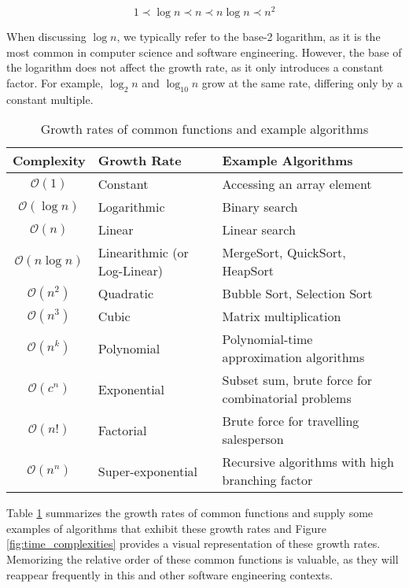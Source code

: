 \[
1 \prec \log n \prec n \prec n \log n \prec n^2
\]

\begin{remark}
    When discussing $\log n$, we typically refer to the base-2 logarithm, as it is the most common in computer science and software engineering. However, the base of the logarithm does not affect the growth rate, as it only introduces a constant factor. For example, $\log_2 n$ and $\log_{10} n$ grow at the same rate, differing only by a constant multiple.
\end{remark}

\begin{table}[h]
    \centering
    \renewcommand{\arraystretch}{1.4}
    \begin{tabular}{|c|l|l|}
        \hline
        \textbf{Complexity} & \textbf{Growth Rate} & \textbf{Example Algorithms} \\
        \hline
        \( \mathcal{O}(1) \) & Constant & Accessing an array element \\
        \hline
        \( \mathcal{O}(\log n) \) & Logarithmic & Binary search \\
        \hline
        \( \mathcal{O}(n) \) & Linear & Linear search \\
        \hline
        \( \mathcal{O}(n \log n) \) & Linearithmic (or Log-Linear) & MergeSort, QuickSort, HeapSort \\
        \hline
        \( \mathcal{O}(n^2) \) & Quadratic & Bubble Sort, Selection Sort \\
        \hline
        \( \mathcal{O}(n^3) \) & Cubic & Matrix multiplication \\
        \hline
        \( \mathcal{O}(n^k) \) & Polynomial & Polynomial-time approximation algorithms \\
        \hline
        \( \mathcal{O}(c^n) \) & Exponential & Subset sum, brute force for combinatorial problems \\
        \hline
        \( \mathcal{O}(n!) \) & Factorial & Brute force for travelling salesperson \\
        \hline
        \( \mathcal{O}(n^n) \) & Super-exponential & Recursive algorithms with high branching factor \\
        \hline
    \end{tabular}
    \caption{Growth rates of common functions and example algorithms}
    \label{tab:growth_rates}
\end{table}


Table \ref{tab:growth_rates} summarizes the growth rates of common functions and supply some examples of algorithms that exhibit these growth rates and Figure \ref{fig:time_complexities} provides a visual representation of these growth rates. Memorizing the relative order of these common functions is valuable, as they will reappear frequently in this and other software engineering contexts.

